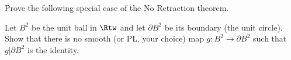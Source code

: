 Prove the following special case of the No Retraction theorem. 

Let $B^2$ be the unit ball in $\Rtw$ and let $\partial B^2$ be its
boundary (the unit circle). Show that there is no smooth (or PL, your
choice) map $g:B^2\rightarrow \partial B^2$ such that $g|\partial B^2$
is the identity.
